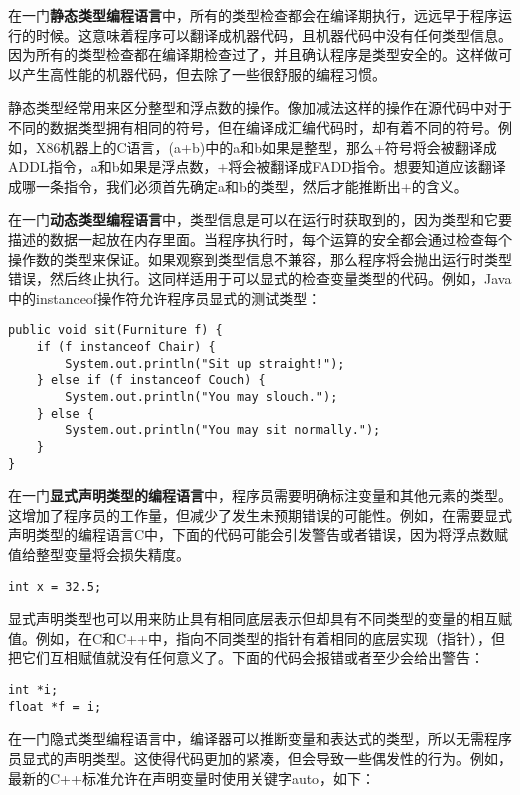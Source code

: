\documentclass[cn,11pt,chinese]{elegantbook}
\begin{document}
在一门\textbf{静态类型编程语言}中，所有的类型检查都会在编译期执行，远远早于程序运行的时候。这意味着程序可以翻译成机器代码，且机器代码中没有任何类型信息。因为所有的类型检查都在编译期检查过了，并且确认程序是类型安全的。这样做可以产生高性能的机器代码，但去除了一些很舒服的编程习惯。

静态类型经常用来区分整型和浮点数的操作。像加减法这样的操作在源代码中对于不同的数据类型拥有相同的符号，但在编译成汇编代码时，却有着不同的符号。例如，X86机器上的C语言，(a+b)中的a和b如果是整型，那么+符号将会被翻译成ADDL指令，a和b如果是浮点数，+将会被翻译成FADD指令。想要知道应该翻译成哪一条指令，我们必须首先确定a和b的类型，然后才能推断出+的含义。

在一门\textbf{动态类型编程语言}中，类型信息是可以在运行时获取到的，因为类型和它要描述的数据一起放在内存里面。当程序执行时，每个运算的安全都会通过检查每个操作数的类型来保证。如果观察到类型信息不兼容，那么程序将会抛出运行时类型错误，然后终止执行。这同样适用于可以显式的检查变量类型的代码。例如，Java中的instanceof操作符允许程序员显式的测试类型：

\begin{verbatim}
public void sit(Furniture f) {
    if (f instanceof Chair) {
        System.out.println("Sit up straight!");
    } else if (f instanceof Couch) {
        System.out.println("You may slouch.");
    } else {
        System.out.println("You may sit normally.");
    }
}
\end{verbatim}

在一门\textbf{显式声明类型的编程语言}中，程序员需要明确标注变量和其他元素的类型。这增加了程序员的工作量，但减少了发生未预期错误的可能性。例如，在需要显式声明类型的编程语言C中，下面的代码可能会引发警告或者错误，因为将浮点数赋值给整型变量将会损失精度。

\begin{verbatim}
int x = 32.5;
\end{verbatim}

显式声明类型也可以用来防止具有相同底层表示但却具有不同类型的变量的相互赋值。例如，在C和C++中，指向不同类型的指针有着相同的底层实现（指针），但把它们互相赋值就没有任何意义了。下面的代码会报错或者至少会给出警告：

\begin{verbatim}
int *i;
float *f = i;
\end{verbatim}

在一门隐式类型编程语言中，编译器可以推断变量和表达式的类型，所以无需程序员显式的声明类型。这使得代码更加的紧凑，但会导致一些偶发性的行为。例如，最新的C++标准允许在声明变量时使用关键字auto，如下：
\end{document}
